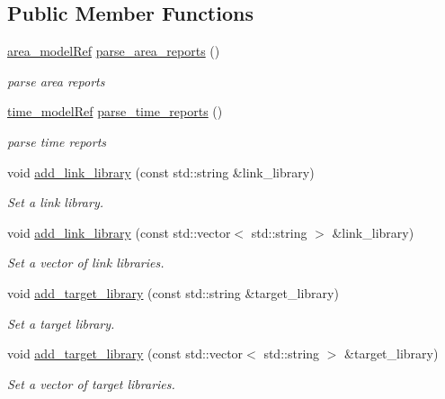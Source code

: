 \subsection*{Public Member Functions}
\begin{DoxyCompactItemize}
\item 
\hyperlink{area__model_8hpp_aec11e4e9b1b3afd49a437cb37df0abfb}{area\+\_\+model\+Ref} \hyperlink{classDesignCompilerWrapper_a6fa8c9faab67d5c8d627562108c1c34d}{parse\+\_\+area\+\_\+reports} ()
\begin{DoxyCompactList}\small\item\em parse area reports \end{DoxyCompactList}\item 
\hyperlink{time__model_8hpp_ae203bb7faf1c278333f76fcc6ebe412c}{time\+\_\+model\+Ref} \hyperlink{classDesignCompilerWrapper_a909166c0af1cb85b7ac5557add21f67c}{parse\+\_\+time\+\_\+reports} ()
\begin{DoxyCompactList}\small\item\em parse time reports \end{DoxyCompactList}\item 
void \hyperlink{classDesignCompilerWrapper_a4a53eb9384dba2e687b07a1d9837ebe4}{add\+\_\+link\+\_\+library} (const std\+::string \&link\+\_\+library)
\begin{DoxyCompactList}\small\item\em Set a link library. \end{DoxyCompactList}\item 
void \hyperlink{classDesignCompilerWrapper_aa44a4aaa4e67a1aca3e7cc80f1d9283d}{add\+\_\+link\+\_\+library} (const std\+::vector$<$ std\+::string $>$ \&link\+\_\+library)
\begin{DoxyCompactList}\small\item\em Set a vector of link libraries. \end{DoxyCompactList}\item 
void \hyperlink{classDesignCompilerWrapper_a8452f034e2bfc1c8b0fb2a3b4353eb88}{add\+\_\+target\+\_\+library} (const std\+::string \&target\+\_\+library)
\begin{DoxyCompactList}\small\item\em Set a target library. \end{DoxyCompactList}\item 
void \hyperlink{classDesignCompilerWrapper_a5da5846f6792e3f3ca31481ed2efd252}{add\+\_\+target\+\_\+library} (const std\+::vector$<$ std\+::string $>$ \&target\+\_\+library)
\begin{DoxyCompactList}\small\item\em Set a vector of target libraries. \end{DoxyCompactList}\item 

\end{DoxyCompactItemize}

